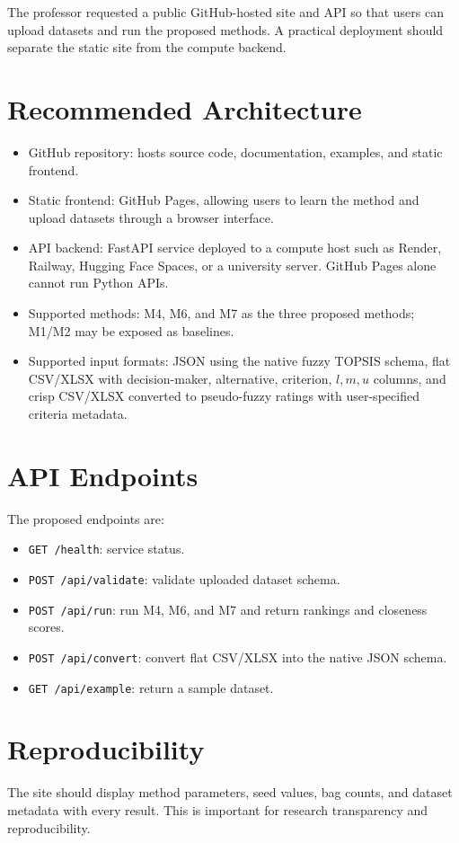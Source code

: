 The professor requested a public GitHub-hosted site and API so that users can upload datasets and run the proposed methods. A practical deployment should separate the static site from the compute backend.

\section{Recommended Architecture}
\begin{itemize}
    \item GitHub repository: hosts source code, documentation, examples, and static frontend.
    \item Static frontend: GitHub Pages, allowing users to learn the method and upload datasets through a browser interface.
    \item API backend: FastAPI service deployed to a compute host such as Render, Railway, Hugging Face Spaces, or a university server. GitHub Pages alone cannot run Python APIs.
    \item Supported methods: M4, M6, and M7 as the three proposed methods; M1/M2 may be exposed as baselines.
    \item Supported input formats: JSON using the native fuzzy TOPSIS schema, flat CSV/XLSX with decision-maker, alternative, criterion, \(l,m,u\) columns, and crisp CSV/XLSX converted to pseudo-fuzzy ratings with user-specified criteria metadata.
\end{itemize}

\section{API Endpoints}
The proposed endpoints are:
\begin{itemize}
    \item \texttt{GET /health}: service status.
    \item \texttt{POST /api/validate}: validate uploaded dataset schema.
    \item \texttt{POST /api/run}: run M4, M6, and M7 and return rankings and closeness scores.
    \item \texttt{POST /api/convert}: convert flat CSV/XLSX into the native JSON schema.
    \item \texttt{GET /api/example}: return a sample dataset.
\end{itemize}

\section{Reproducibility}
The site should display method parameters, seed values, bag counts, and dataset metadata with every result. This is important for research transparency and reproducibility.
